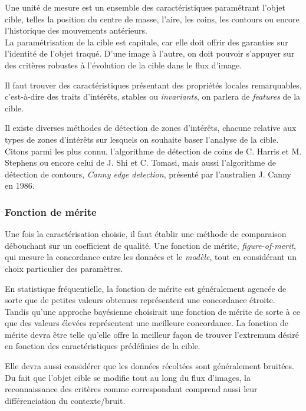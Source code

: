 \documentclass[a4paper,12pt]{report}
\begin{document}
Une unité de mesure est un ensemble des caractéristiques paramétrant l'objet cible, telles la position du centre de masse, l'aire, les coins, les contours ou encore l'historique des mouvements antérieurs. \\

La paramétrisation de la cible est capitale, car elle doit offrir des garanties sur l'identité de l'objet traqué. 
D'une image à l'autre, on doit pouvoir s'appuyer sur des critères robustes à l'évolution de la cible dans le flux d'image.


Il faut trouver des caractéristiques présentant des propriétés locales remarquables, c'est-à-dire des traits d'intérêts, stables ou \textit{invariants}, on parlera de \textit{features} de la cible.

Il existe diverses méthodes de détection de zones d'intérêts, chacune relative aux types de zones d'intérêts sur lesquels on souhaite baser l'analyse de la cible. Citons parmi les plus connu, l'algorithme de détection de coins de C. Harris et M. Stephens ou encore celui de J. Shi et C. Tomasi, mais aussi l'algorithme de détection de contours, \textit{Canny edge detection}, présenté par l'australien J. Canny en 1986.\\

\subsubsection{Fonction de mérite}
Une fois la caractérisation choisie, il faut établir une méthode de comparaison débouchant sur un coefficient de qualité.
Une fonction de mérite, \textit{figure-of-merit}, qui mesure la concordance entre les données et le \textit{modèle}, tout en considérant un choix particulier des paramètres.

En statistique fréquentielle, la fonction de mérite est généralement agencée de sorte que de petites valeurs obtenues représentent une concordance étroite. Tandis qu'une approche bayésienne choisirait une fonction de mérite de sorte à ce que des valeurs élevées représentent une meilleure concordance\cite{n}.
La fonction de mérite devra être telle qu'elle offre la meilleur façon de trouver l'extremum désiré en fonction des caractéristiques prédéfinies de la cible.

Elle devra aussi considérer que les données récoltées sont généralement bruitées.
Du fait que l'objet cible se modifie tout au long du flux d'images, la reconnaissance des critères comme correspondant comprend aussi leur différenciation du contexte/bruit. 
\end{document}
